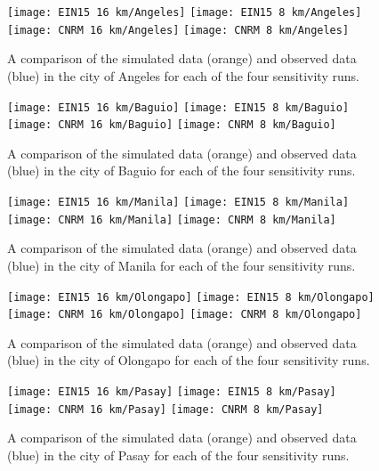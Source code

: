 \begin{figure}	
	\centering
	\texttt{[image: EIN15 16 km/Angeles]}
	\texttt{[image: EIN15 8 km/Angeles]}
	\texttt{[image: CNRM 16 km/Angeles]}
	\texttt{[image: CNRM 8 km/Angeles]}
	\caption{
		A comparison of the simulated data (orange) and observed data (blue) in the city of Angeles for each of the four sensitivity runs.
	}
	\label{fig:appendix-sim-vs-observed-angeles}
\end{figure}

\begin{figure}	
	\centering
	\texttt{[image: EIN15 16 km/Baguio]}
	\texttt{[image: EIN15 8 km/Baguio]}
	\texttt{[image: CNRM 16 km/Baguio]}
	\texttt{[image: CNRM 8 km/Baguio]}
	\caption{
		A comparison of the simulated data (orange) and observed data (blue) in the city of Baguio for each of the four sensitivity runs.
	}
	\label{fig:appendix-sim-vs-observed-baguio}
\end{figure}

\begin{figure}	
	\centering
	\texttt{[image: EIN15 16 km/Manila]}
	\texttt{[image: EIN15 8 km/Manila]}
	\texttt{[image: CNRM 16 km/Manila]}
	\texttt{[image: CNRM 8 km/Manila]}
	\caption{
		A comparison of the simulated data (orange) and observed data (blue) in the city of Manila for each of the four sensitivity runs.
	}
	\label{fig:appendix-sim-vs-observed-manila}
\end{figure}

\begin{figure}	
	\centering
	\texttt{[image: EIN15 16 km/Olongapo]}
	\texttt{[image: EIN15 8 km/Olongapo]}
	\texttt{[image: CNRM 16 km/Olongapo]}
	\texttt{[image: CNRM 8 km/Olongapo]}
	\caption{
		A comparison of the simulated data (orange) and observed data (blue) in the city of Olongapo for each of the four sensitivity runs.
	}
	\label{fig:appendix-sim-vs-observed-olongapo}
\end{figure}

\begin{figure}	
	\centering
	\texttt{[image: EIN15 16 km/Pasay]}
	\texttt{[image: EIN15 8 km/Pasay]}
	\texttt{[image: CNRM 16 km/Pasay]}
	\texttt{[image: CNRM 8 km/Pasay]}
	\caption{
		A comparison of the simulated data (orange) and observed data (blue) in the city of Pasay for each of the four sensitivity runs.
	}
	\label{fig:appendix-sim-vs-observed-pasay}
\end{figure}

